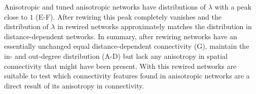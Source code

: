 Anisotropic and tuned anisotropic networks have distributions of
$\lambda$ with a peak close to $1$ (E-F). After
rewiring this peak completely vanishes and the distribution of
$\lambda$ in rewired networks approximately matches the distribution
in distance-dependent networks. In summary, after rewiring networks
have an essentially unchanged equal distance-dependent connectivity
(G), maintain the in- and out-degree
distribution (A-D) but lack any anisotropy in
spatial connectivity that might have been present. With this rewired
networks are suitable to test which connectivity features found in
anisotropic networks are a direct result of its anisotropy in
connectivity.









